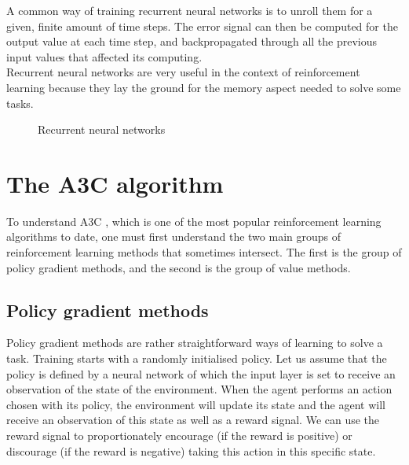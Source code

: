 A common way of training recurrent neural networks is to unroll them for a 
given, finite amount of time steps. The error signal can then be computed
for the output value at each time step, and backpropagated through all the
previous input values that affected its computing.\\

Recurrent neural networks are very useful in the context of reinforcement 
learning because they lay the ground for the memory aspect needed to solve
some tasks.

\begin{figure}[]
	\centering
	\qquad
	\caption{Recurrent neural networks}
	\label{fig:rnn}
\end{figure}


\section{The A3C algorithm}
To understand A3C \cite{a3c}, which is one of the most popular reinforcement 
learning algorithms to date, one must first understand the two main groups of
reinforcement learning methods that sometimes intersect. The first is the 
group of policy gradient methods, and the second is the group of value 
methods.

\subsection{Policy gradient methods}
Policy gradient methods are rather straightforward ways of learning to solve a task.
Training starts with a randomly initialised policy. Let us assume that the
policy is defined by a neural network of which the input layer is set to 
receive an observation of the state of the environment. 
When the agent performs an action chosen with its policy, the environment will
update its state and the agent will receive an observation of this state as
well as a reward signal. We can use the reward signal to proportionately
encourage (if the reward is 
positive) or discourage (if the reward is negative) taking this action in 
this specific state. \\


